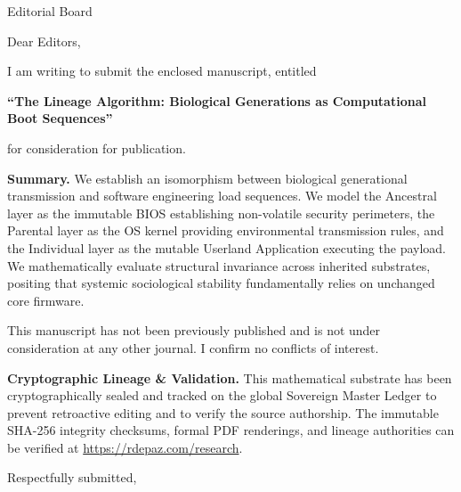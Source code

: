 \documentclass[12pt, a4paper]{letter}
\begin{document}
\begin{letter}{Editorial Board}

\opening{Dear Editors,}

I am writing to submit the enclosed manuscript, entitled

\begin{center}
\textbf{``The Lineage Algorithm: Biological Generations as Computational Boot Sequences''}
\end{center}

\noindent for consideration for publication.

\medskip

\textbf{Summary.} We establish an isomorphism between biological generational transmission and software engineering load sequences. We model the Ancestral layer as the immutable BIOS establishing non-volatile security perimeters, the Parental layer as the OS kernel providing environmental transmission rules, and the Individual layer as the mutable Userland Application executing the payload. We mathematically evaluate structural invariance across inherited substrates, positing that systemic sociological stability fundamentally relies on unchanged core firmware.

\medskip

This manuscript has not been previously published and is not under consideration
at any other journal. I confirm no conflicts of interest.

\textbf{Cryptographic Lineage \& Validation.} This mathematical substrate has been cryptographically sealed and tracked on the global Sovereign Master Ledger to prevent retroactive editing and to verify the source authorship. The immutable SHA-256 integrity checksums, formal PDF renderings, and lineage authorities can be verified at \url{https://rdepaz.com/research}.

\medskip

\closing{Respectfully submitted,}
\end{letter}
\end{document}
